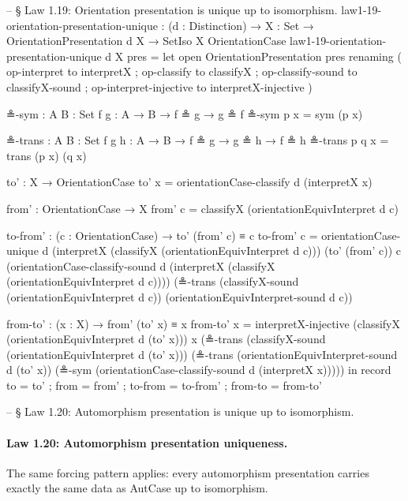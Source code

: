 \documentclass[11pt,a4paper]{book}
\def\texttt#1{#1}%
\begin{document}
\begin{code}
-- § Law 1.19: Orientation presentation is unique up to isomorphism.
law1-19-orientation-presentation-unique :
  (d : Distinction) →
  {X : Set} →
  OrientationPresentation d X →
  SetIso X OrientationCase
law1-19-orientation-presentation-unique d {X} pres =
  let
    open OrientationPresentation pres
      renaming
        ( op-interpret to interpretX
        ; op-classify to classifyX
        ; op-classify-sound to classifyX-sound
        ; op-interpret-injective to interpretX-injective
        )

    ≗-sym : {A B : Set} {f g : A → B} → f ≗ g → g ≗ f
    ≗-sym p x = sym (p x)

    ≗-trans : {A B : Set} {f g h : A → B} → f ≗ g → g ≗ h → f ≗ h
    ≗-trans p q x = trans (p x) (q x)

    to' : X → OrientationCase
    to' x = orientationCase-classify d (interpretX x)

    from' : OrientationCase → X
    from' c = classifyX (orientationEquivInterpret d c)

    to-from' : (c : OrientationCase) → to' (from' c) ≡ c
    to-from' c =
      orientationCase-unique d (interpretX (classifyX (orientationEquivInterpret d c)))
        (to' (from' c))
        c
        (orientationCase-classify-sound d (interpretX (classifyX (orientationEquivInterpret d c))))
        (≗-trans
          (classifyX-sound (orientationEquivInterpret d c))
          (orientationEquivInterpret-sound d c))

    from-to' : (x : X) → from' (to' x) ≡ x
    from-to' x =
      interpretX-injective
        (classifyX (orientationEquivInterpret d (to' x)))
        x
        (≗-trans
          (classifyX-sound (orientationEquivInterpret d (to' x)))
          (≗-trans
            (orientationEquivInterpret-sound d (to' x))
            (≗-sym (orientationCase-classify-sound d (interpretX x)))))
  in
  record
    { to = to'
    ; from = from'
    ; to-from = to-from'
    ; from-to = from-to'
    }

-- § Law 1.20: Automorphism presentation is unique up to isomorphism.
\end{code}

\paragraph{Law 1.20: Automorphism presentation uniqueness.}
The same forcing pattern applies: every automorphism presentation carries exactly the same data as \texttt{AutCase} up to isomorphism.
\end{document}
